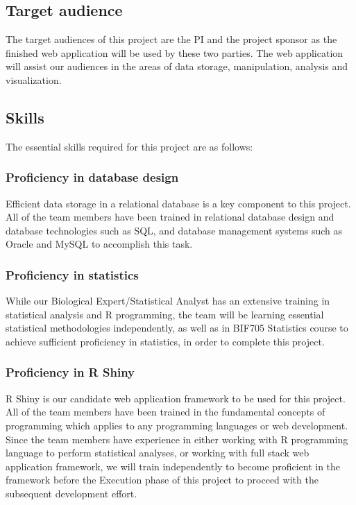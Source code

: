 \documentclass[10pt,twocolumn,letterpaper]{article}
\begin{document}
            \subsection{Target audience}
            The target audiences of this project are the PI and the project sponsor as the finished web application will be used by these two parties. The web application will assist our audiences in the areas of data storage, manipulation, analysis and visualization.

            \subsection{Skills}

            The essential skills required for this project are as follows:
            \subsubsection{Proficiency in database design}
            Efficient data storage in a relational database is a key component to this project. All of the team members have been trained in relational database design and database technologies such as SQL, and database management systems such as Oracle and MySQL to accomplish this task.
            \subsubsection{Proficiency in statistics}
            While our Biological Expert/Statistical Analyst has an extensive training in statistical analysis and R programming, the team will be learning essential statistical methodologies independently, as well as in BIF705 Statistics course to achieve sufficient proficiency in statistics, in order to complete this project.
            \subsubsection{Proficiency in R Shiny}
            R Shiny is our candidate web application framework to be used for this project. 
            All of the team members have been trained in the fundamental concepts of programming which applies to any programming languages or web development. 
            Since the team members have experience in either working with R programming language to perform statistical analyses, or working with full stack web application framework, we will train independently to become proficient in the framework before the Execution phase of this project to proceed with the subsequent development effort.
\end{document}
